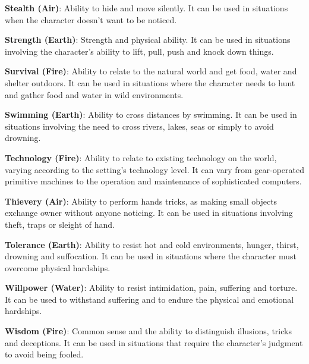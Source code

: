 \begin{multicols}{2}
\textbf{Stealth (Air)}: Ability to hide and move
silently. It can be used in situations when the
character doesn’t want to be noticed.

\textbf{Strength (Earth)}: Strength and physical
ability. It can be used in situations involving the
character's ability to lift, pull, push and knock
down things.

\textbf{Survival (Fire)}: Ability to relate to the
natural world and get food, water and shelter
outdoors. It can be used in situations where the
character needs to hunt and gather food and water
in wild environments.

\textbf{Swimming (Earth)}: Ability to cross
distances by swimming. It can be used in
situations involving the need to cross rivers, lakes,
seas or simply to avoid drowning.

\textbf{Technology (Fire)}: Ability to relate to
existing technology on the world, varying
according to the setting’s technology level. It can
vary from gear-operated primitive machines to the
operation and maintenance of sophisticated
computers.

\textbf{Thievery (Air)}: Ability to perform hands
tricks, as making small objects exchange owner
without anyone noticing. It can be used in
situations involving theft, traps or sleight of hand.

\textbf{Tolerance (Earth)}: Ability to resist hot
and cold environments, hunger, thirst, drowning
and suffocation. It can be used in situations where
the character must overcome physical hardships.

\textbf{Willpower (Water)}: Ability to resist
intimidation, pain, suffering and torture. It can be
used to withstand suffering and to endure the
physical and emotional hardships.

\textbf{Wisdom (Fire)}: Common sense and the
ability to distinguish illusions, tricks and
deceptions. It can be used in situations that
require the character’s judgment to avoid being
fooled.
\end{multicols}

